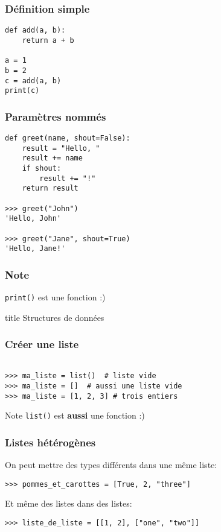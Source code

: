 \documentclass{beamer}
\begin{document}
\begin{frame}[fragile]
  \frametitle{Définition simple}

\begin{lstlisting}
def add(a, b):
    return a + b

a = 1
b = 2
c = add(a, b)
print(c)
\end{lstlisting}

\end{frame}

\begin{frame}[fragile]
  \frametitle{Paramètres nommés}
\begin{lstlisting}
def greet(name, shout=False):
    result = "Hello, "
    result += name
    if shout:
        result += "!"
    return result

>>> greet("John")
'Hello, John'

>>> greet("Jane", shout=True)
'Hello, Jane!'
\end{lstlisting}


\end{frame}

\begin{frame}[fragile]
  \frametitle{Note}
\texttt{print()} est une fonction :)
\end{frame}


\begin{frame}[fragile]
  \begin{beamercolorbox}[sep=8pt,center,shadow=true,rounded=true]{title}
    Structures de données
  \end{beamercolorbox}
\end{frame}

\begin{frame}[fragile]
  \frametitle{Créer une liste}
\begin{lstlisting}

>>> ma_liste = list()  # liste vide
>>> ma_liste = []  # aussi une liste vide
>>> ma_liste = [1, 2, 3] # trois entiers

\end{lstlisting}

\vfill

\begin{alertblock}{Note}
  \texttt{list()} est \textbf{aussi} une fonction :)
\end{alertblock}

\end{frame}

\begin{frame}[fragile]
  \frametitle{Listes hétérogènes}

On peut mettre des types différents dans une même liste:

\begin{lstlisting}
>>> pommes_et_carottes = [True, 2, "three"]
\end{lstlisting}

\vfill
Et même des listes dans des listes:

\begin{lstlisting}
>>> liste_de_liste = [[1, 2], ["one", "two"]]
\end{lstlisting}


\end{frame}
\end{document}
